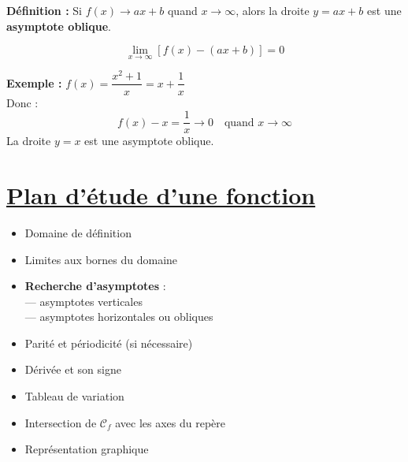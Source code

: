 \documentclass[12pt]{article}
\begin{document}
\begin{tcolorbox}[colback=red!5!white, colframe=red!80!black]
    \textbf{Définition :} Si \( f(x) \to ax + b \) quand \( x \to \infty \), alors la droite \( y = ax + b \) est une \textbf{asymptote oblique}.

    \[
        \lim_{x \to \infty} \left[ f(x) - (ax + b) \right] = 0
    \]
\end{tcolorbox}

\textbf{Exemple :} \( f(x) = \dfrac{x^2 + 1}{x} = x + \dfrac{1}{x} \) \\
Donc :
\[
    f(x) - x = \dfrac{1}{x} \to 0 \quad \text{quand } x \to \infty
\]
La droite \( y = x \) est une asymptote oblique.

\section*{\textcolor{green!50!black}{\underline{Plan d’étude d’une fonction}}}

\begin{itemize}
    \item Domaine de définition
    \item Limites aux bornes du domaine
    \item \textbf{Recherche d’asymptotes} :\\
          \hspace*{0.5cm}— asymptotes verticales\\
          \hspace*{0.5cm}— asymptotes horizontales ou obliques
    \item Parité et périodicité (si nécessaire)
    \item Dérivée et son signe
    \item Tableau de variation
    \item Intersection de $\mathcal{C}_f$ avec les axes du repère
    \item Représentation graphique
\end{itemize}
\end{document}
